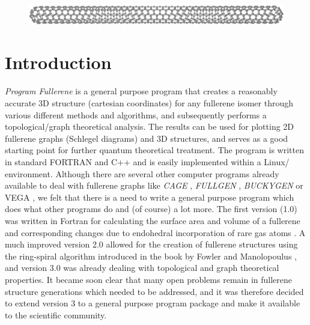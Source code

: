 \documentclass[article,a4paper,twoside]{memoir}
\let\acr=\textsmaller
\newcommand{\program}[1]{\textit{#1}}
\begin{document}
 \begin{figure}[htbp]
   	\centering
  	\includegraphics[width=\textwidth]{C840.png}
 \end{figure} 

\clearpage

\section{Introduction}
\textit{Program Fullerene} is a general purpose program that creates a reasonably accurate 3D structure
(cartesian coordinates) for any fullerene isomer through various different methods and algorithms, and subsequently performs a topological/graph 
theoretical analysis. The results can be used for plotting 2D fullerene graphs (Schlegel diagrams) 
and 3D structures, and serves as a good starting point for further quantum theoretical treatment. The program is 
written in standard FORTRAN and C++ and is easily implemented within a Linux/\acr{UNIX} environment.
Although there are several other computer programs already available to deal with fullerene graphs 
like \program{CAGE} \cite{Brinkmanx}, \program{FULLGEN} \cite{Brinkman}, \program{BUCKYGEN} \cite{Goedgebeur,Goedgebeur1} or VEGA \cite{Pisanski},
we felt that there is a need to write a general purpose program which does what other programs do and (of course) a lot more.
The first version (1.0) was written in Fortran for calculating the surface area and volume of a fullerene and corresponding changes due to endohedral 
incorporation of rare gas atoms \cite{Tonner}. A much improved version 2.0 allowed for the creation of fullerene structures using
the ring-spiral algorithm introduced in the book by Fowler and Manolopoulus \cite{Atlas}, and version 3.0 was already dealing with
topological and graph theoretical properties. It became soon clear that many open problems remain in fullerene structure generations
which needed to be addressed, and it was therefore decided to extend version 3 to a general purpose program package and make it available
to the scientific community.
\end{document}
